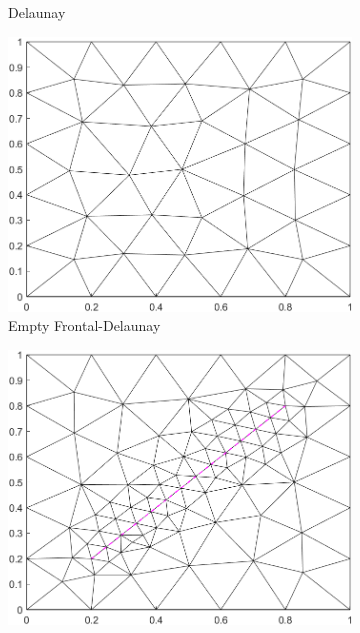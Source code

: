 \begin{figure}[ht]
\begin{subfigure}[b]{0.33\textwidth}
        \caption{Delaunay}
        \label{fig:Gmsh-Delaunay}
    \end{subfigure}
    \begin{subfigure}[b]{0.33\textwidth}
        \centering
        \includegraphics[width=\textwidth]{report/Images/Software/Gmsh meshing algorithms/gmsh_meshing_algorithms_frontal.png}
        \caption{Empty Frontal-Delaunay}
        \label{fig:Gmsh-Frontal-Delaunay-empty}
    \end{subfigure}
    \begin{subfigure}[b]{0.33\textwidth}
        \centering
        \includegraphics[width=\textwidth]{report/Images/Software/Gmsh meshing algorithms/gmsh_meshing_algorithms_embedded_frontal.png}

\end{subfigure}
\end{figure}
